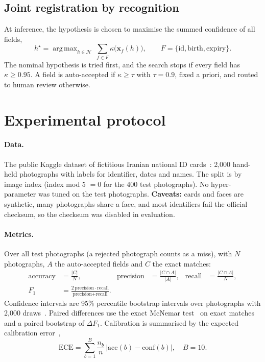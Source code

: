 \documentclass[11pt,a4paper]{article}
\newcommand{\Fone}{F_1}
\DeclareMathOperator*{\argmax}{arg\,max}
\begin{document}
\subsection{Joint registration by recognition}\label{sec:joint}
At inference, the hypothesis is chosen to maximise the summed confidence of all fields,
\begin{equation}
h^\star=\argmax_{h\in\mathcal{H}}\ \sum_{f\in F}\kappa\big(\mathbf{x}_f(h)\big),\qquad F=\{\text{id},\text{birth},\text{expiry}\}.
\end{equation}
The nominal hypothesis is tried first, and the search stops if every field has $\kappa\ge0.95$. A field is auto-accepted if $\kappa\ge\tau$ with $\tau=0.9$, fixed a priori, and routed to human review otherwise.

\section{Experimental protocol}
\paragraph{Data.} The public Kaggle dataset of fictitious Iranian national ID cards~\cite{kaggleiranid}: 2{,}000 hand-held photographs with labels for identifier, dates and names. The split is by image index (index mod 5 $=0$ for the 400 test photographs). No hyper-parameter was tuned on the test photographs. \textbf{Caveats:} cards and faces are synthetic, many photographs share a face, and most identifiers fail the official checksum, so the checksum was disabled in evaluation.
\paragraph{Metrics.} Over all test photographs (a rejected photograph counts as a miss), with $N$ photographs, $A$ the auto-accepted fields and $C$ the exact matches:
\begin{align}
\text{accuracy}&=\frac{|C|}{N}, & \text{precision}&=\frac{|C\cap A|}{|A|}, & \text{recall}&=\frac{|C\cap A|}{N},\\
\Fone&=\frac{2\,\text{precision}\cdot\text{recall}}{\text{precision}+\text{recall}}.
\end{align}
Confidence intervals are 95\% percentile bootstrap intervals over photographs with 2{,}000 draws~\cite{efron1993bootstrap}. Paired differences use the exact McNemar test~\cite{mcnemar1947} on exact matches and a paired bootstrap of $\Delta\Fone$. Calibration is summarised by the expected calibration error~\cite{guo2017calibration},
\begin{equation}
\text{ECE}=\sum_{b=1}^{B}\frac{n_b}{n}\,\bigl|\text{acc}(b)-\text{conf}(b)\bigr|,\quad B=10 .
\end{equation}
\end{document}
